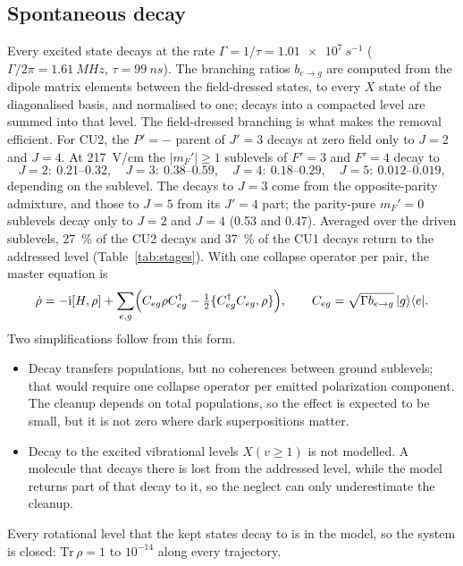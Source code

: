 \documentclass[11pt,a4paper,oneside]{report}
\begin{document}
\subsection{Spontaneous decay}
\label{sec:model_decay}

Every excited state decays at the rate $\Gamma=1/\tau=\SI{1.01e7}{s^{-1}}$
($\Gamma/2\pi=\SI{1.61}{MHz}$, $\tau=\SI{99}{ns}$). The branching ratios $b_{e\to g}$ are computed
from the dipole matrix elements between the field-dressed states, to every $X$ state of the
diagonalised basis, and normalised to one; decays into a compacted level are summed into that
level. The field-dressed branching is what makes the removal efficient. For CU2, the $P'=-$ parent
of $J'=3$ decays at zero field only to $J=2$ and $J=4$. At \SI{217}{V/cm} the $|m_F'|\geq1$
sublevels of $F'=3$ and $F'=4$ decay to
\begin{equation*}
  J=2:\ 0.21\text{--}0.32,\quad J=3:\ 0.38\text{--}0.59,\quad J=4:\ 0.18\text{--}0.29,\quad
  J=5:\ 0.012\text{--}0.019,
\end{equation*}
depending on the sublevel. The decays to $J=3$ come from the opposite-parity admixture, and those to
$J=5$ from its $J'=4$ part; the parity-pure $m_F'=0$ sublevels decay only to $J=2$ and $J=4$ (0.53
and 0.47). Averaged over the driven sublevels, \SI{27}{\percent} of the CU2 decays and
\SI{37}{\percent} of the CU1 decays return to the addressed level (Table~\ref{tab:stages}). With one
collapse operator per pair, the master equation is
\begin{equation}
  \dot\rho=-\mathrm i[H,\rho]+\sum_{e,g}\Bigl(C_{eg}\rho C_{eg}^\dagger-\tfrac12\{C_{eg}^\dagger
  C_{eg},\rho\}\Bigr),\qquad C_{eg}=\sqrt{\Gamma b_{e\to g}}\,|g\rangle\langle e|.
  \label{eq:lindblad}
\end{equation}
Two simplifications follow from this form.
\begin{itemize}[itemsep=1pt]
  \item Decay transfers populations, but no coherences between ground sublevels; that would require one
        collapse operator per emitted polarization component. The cleanup depends on total
        populations, so the effect is expected to be small, but it is not zero where dark
        superpositions matter.
  \item Decay to the excited vibrational levels $X(v\geq1)$ is not modelled. A molecule that decays
        there is lost from the addressed level, while the model returns part of that decay to it, so
        the neglect can only underestimate the cleanup.
\end{itemize}
Every rotational level that the kept states decay to is in the model, so the system is closed:
$\mathrm{Tr}\,\rho=1$ to $10^{-14}$ along every trajectory.
\end{document}
